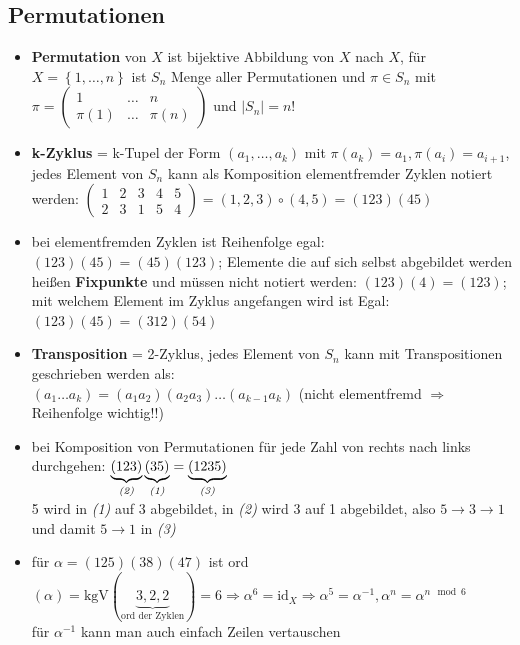 \documentclass[10pt,a4paper]{article}
\begin{document}
\subsection{Permutationen}
\begin{itemize}
\item \textbf{Permutation} von $X$ ist bijektive Abbildung von $X$ nach $X$, für $X=\left\lbrace 1,\dotsc, n\right\rbrace$ ist $S_{n}$ Menge aller Permutationen und $\pi \in S_{n}$ mit $\pi=\begin{pmatrix}1&\dotsc& n\\ \pi(1)&\dotsc &\pi(n)\end{pmatrix} $ und $\vert S_{n}\vert =n!$
\item \textbf{k-Zyklus} = k-Tupel der Form $(a_{1},\dotsc,a_{k})$ mit $\pi(a_{k})=a_{1}, \pi(a_{i})=a_{i+1}$, jedes Element von $S_{n}$ kann als Komposition elementfremder Zyklen notiert werden: $\begin{pmatrix}1&2& 3&4&5\\ 2&3&1&5&4\end{pmatrix}=(1,2,3)\circ (4,5)=(123)(45)$
\item bei elementfremden Zyklen ist Reihenfolge egal: $(123)(45)=(45)(123)$; Elemente die auf sich selbst abgebildet werden heißen \textbf{Fixpunkte} und müssen nicht notiert werden: $(123)(4)=(123)$; mit welchem Element im Zyklus angefangen wird ist Egal: $(123)(45)=(312)(54)$ 
\item \textbf{Transposition} = 2-Zyklus, jedes Element von $S_{n}$ kann mit Transpositionen geschrieben werden als:\\ $(a_{1}\dotsc a_{k})=(a_{1}a_{2})(a_{2}a_{3})\dotsc(a_{k-1}a_{k})$ (nicht elementfremd $\Rightarrow$ Reihenfolge wichtig!!)
\item bei Komposition von Permutationen für jede Zahl von rechts nach links durchgehen: $\underbrace{(123)}_{\text{\textit{(2)}}}\underbrace{(35)}_{\text{\textit{(1)}}}=\underbrace{(1235)}_{\text{\textit{(3)}}}$\\5 wird in \textit{(1)} auf 3 abgebildet, in \textit{(2)} wird 3 auf 1 abgebildet, also $5\rightarrow 3 \rightarrow 1$ und damit $5\rightarrow 1$  in \textit{(3)} 
\item für $\alpha=(125)(38)(47)$ ist ord$(\alpha)=\text{kgV}(\underbrace{3,2,2}_{\text{ord der Zyklen}})=6\Rightarrow \alpha^{6}=\text{id}_{X} \Rightarrow \alpha^{5}=\alpha^{-1}, \alpha^{n}=\alpha^{n \mod 6}$\\
für $\alpha^{-1}$ kann man auch einfach Zeilen vertauschen
\end{itemize}
\end{document}
